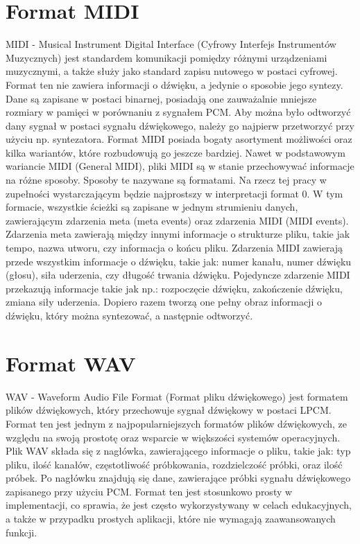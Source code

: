 \section{Format MIDI}
MIDI\cite{bib:MIDI} - Musical Instrument Digital Interface (Cyfrowy Interfejs Instrumentów Muzycznych) jest standardem komunikacji pomiędzy różnymi urządzeniami muzycznymi, a także służy jako standard zapisu nutowego w postaci cyfrowej. Format ten nie zawiera informacji o dźwięku, a jedynie o sposobie jego syntezy. Dane są zapisane w postaci binarnej, posiadają one zauważalnie mniejsze rozmiary w pamięci w porównaniu z sygnałem PCM. Aby można było odtworzyć dany sygnał w postaci sygnału dźwiękowego, należy go najpierw przetworzyć przy użyciu np. syntezatora. Format MIDI posiada bogaty asortyment możliwości oraz kilka wariantów, które rozbudowują go jeszcze bardziej. Nawet w podstawowym wariancie MIDI (General MIDI), pliki MIDI są w stanie przechowywać informacje na różne sposoby. Sposoby te nazywane są formatami. Na rzecz tej pracy w zupełności wystarczającym będzie najprostszy w interpretacji format 0. W tym formacie, wszystkie ścieżki są zapisane w jednym strumieniu danych, zawierającym zdarzenia meta (meta events) oraz zdarzenia MIDI (MIDI events). Zdarzenia meta zawierają między innymi informacje o strukturze pliku, takie jak tempo, nazwa utworu, czy informacja o końcu pliku. Zdarzenia MIDI zawierają przede wszystkim informacje o dźwięku, takie jak: numer kanału, numer dźwięku (głosu), siła uderzenia, czy długość trwania dźwięku. Pojedyncze zdarzenie MIDI przekazują informacje takie jak np.: rozpoczęcie dźwięku, zakończenie dźwięku, zmiana siły uderzenia. Dopiero razem tworzą one pełny obraz informacji o dźwięku, który można syntezować, a następnie odtworzyć.

\section{Format WAV}
WAV\cite{bib:WAV} - Waveform Audio File Format (Format pliku dźwiękowego) jest formatem plików dźwiękowych, który przechowuje sygnał dźwiękowy w postaci LPCM. Format ten jest jednym z najpopularniejszych formatów plików dźwiękowych, ze względu na swoją prostotę oraz wsparcie w większości systemów operacyjnych. Plik WAV składa się z nagłówka, zawierającego informacje o pliku, takie jak: typ pliku, ilość kanałów, częstotliwość próbkowania, rozdzielczość próbki, oraz ilość próbek. Po nagłówku znajdują się dane, zawierające próbki sygnału dźwiękowego zapisanego przy użyciu PCM. Format ten jest stosunkowo prosty w implementacji, co sprawia, że jest często wykorzystywany w celach edukacyjnych, a także w przypadku prostych aplikacji, które nie wymagają zaawansowanych funkcji.
